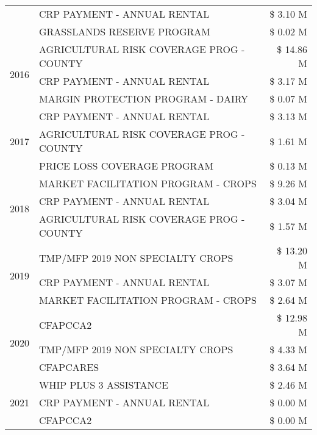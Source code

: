 \begin{tabular}{llr}
 & CRP PAYMENT - ANNUAL RENTAL & \$ 3.10 M \\
 & GRASSLANDS RESERVE PROGRAM & \$ 0.02 M \\
\cline{1-3}
\multirow[t]{3}{*}{2016} & AGRICULTURAL RISK COVERAGE PROG - COUNTY & \$ 14.86 M \\
 & CRP PAYMENT - ANNUAL RENTAL & \$ 3.17 M \\
 & MARGIN PROTECTION PROGRAM - DAIRY & \$ 0.07 M \\
\cline{1-3}
\multirow[t]{3}{*}{2017} & CRP PAYMENT - ANNUAL RENTAL & \$ 3.13 M \\
 & AGRICULTURAL RISK COVERAGE PROG - COUNTY & \$ 1.61 M \\
 & PRICE LOSS COVERAGE PROGRAM & \$ 0.13 M \\
\cline{1-3}
\multirow[t]{3}{*}{2018} & MARKET FACILITATION PROGRAM - CROPS & \$ 9.26 M \\
 & CRP PAYMENT - ANNUAL RENTAL & \$ 3.04 M \\
 & AGRICULTURAL RISK COVERAGE PROG - COUNTY & \$ 1.57 M \\
\cline{1-3}
\multirow[t]{3}{*}{2019} & TMP/MFP 2019 NON SPECIALTY CROPS & \$ 13.20 M \\
 & CRP PAYMENT - ANNUAL RENTAL & \$ 3.07 M \\
 & MARKET FACILITATION PROGRAM - CROPS & \$ 2.64 M \\
\cline{1-3}
\multirow[t]{3}{*}{2020} & CFAPCCA2 & \$ 12.98 M \\
 & TMP/MFP 2019 NON SPECIALTY CROPS & \$ 4.33 M \\
 & CFAPCARES & \$ 3.64 M \\
\cline{1-3}
\multirow[t]{3}{*}{2021} & WHIP PLUS 3 ASSISTANCE & \$ 2.46 M \\
 & CRP PAYMENT - ANNUAL RENTAL & \$ 0.00 M \\
 & CFAPCCA2 & \$ 0.00 M \\
\cline{1-3}
\bottomrule
\end{tabular}
